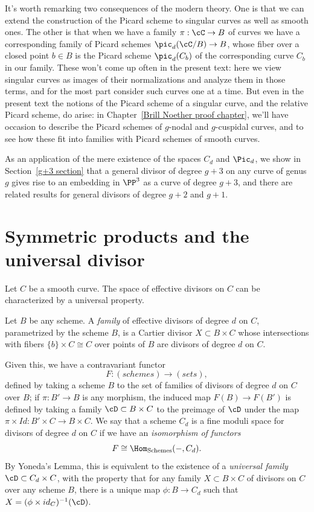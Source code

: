 It's worth remarking two consequences of the modern theory. One is that we can extend the construction of the Picard scheme to singular curves as well as smooth ones. The other is that when we have a family $\pi : \cC \to B$ of curves we have a corresponding family of Picard schemes $\pic_d(\cC/B) \to B$, whose fiber over a closed point $b\in B$ is the Picard scheme $\pic_d(C_b)$ of the corresponding curve $C_b$ in our family.
These won't come up often in the present text: here we view singular curves as images of their normalizations and analyze them in those terms, and for the most part consider such curves one at a time. But even in the present text the notions of the Picard scheme of a singular curve, and the relative Picard scheme, do arise: in Chapter~\ref{Brill Noether proof chapter}, we'll have occasion to describe the Picard schemes of $g$-nodal and $g$-cuspidal curves, and to see how these fit into families with Picard schemes of smooth curves.

As an application of the mere existence of the spaces $C_d$ and $\Pic_d$, we show in Section~\ref{g+3 section} that a general divisor of degree $g+3$ on any curve of genus $g$ gives rise to an embedding in $\PP^3$ as a curve of degree $g+3$, and there are related results for general divisors of degree $g+2$ and $g+1$. 

\section{Symmetric products and the universal divisor}\label{symmetric section}

Let $C$ be a smooth curve. The space of effective divisors on $C$ can be characterized by a universal property. 

\begin{definition}
Let $B$ be any scheme. A \emph{family} of effective divisors of degree $d$ on $C$, parametrized by the scheme $B$, is a Cartier divisor $X\subset B\times C$ whose intersections with fibers $\{b\} \times C \cong C$ over points of $B$ are divisors of degree $d$ on $C$.
\end{definition}

Given this, we have a contravariant functor 
$$
F : (schemes) \to (sets),
$$
defined by taking a scheme $B$ to the set of families of divisors of degree $d$ on $C$over $B$; if $\pi : B' \to B$ is any morphism, the induced map $F(B) \to F(B')$ is defined by taking a family $\cD \subset B \times C$ to the preimage of $\cD$ under the map $\pi \times Id : B' \times C \to B \times C$. We say that a scheme $C_d$ is a fine moduli space for divisors of degree $d$ on $C$ if we have an \emph{isomorphism of functors}
$$
F \cong \Hom_{\rm{Schemes}}( -, C_d).
$$
By Yoneda's Lemma, this is equivalent to the existence of a \emph{universal family} $\cD \subset C_d \times C$, with the property that for any family $X \subset B \times C$ of divisors on $C$ over any scheme $B$, there is a unique map $\phi : B \to C_d$ such that $X = (\phi \times id_{C})^{-1}(\cD)$.

